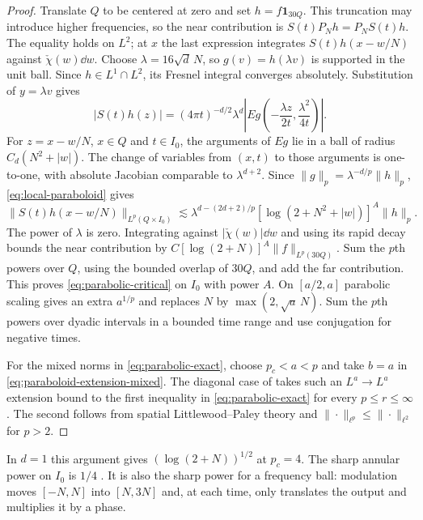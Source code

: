\begin{proof}
Translate $Q$ to be centered at zero and set $h=f\mathbf1_{30Q}$.
This truncation may introduce higher frequencies, so the near contribution
is $S(t)P_Nh=P_NS(t)h$. The equality holds on $L^2$; at $x$ the last
expression integrates $S(t)h(x-w/N)$ against $\check\chi(w)\dd w$.
Choose $\lambda=16\sqrt d\,N$, so $g(v)=h(\lambda v)$ is supported in
the unit ball. Since $h\in L^1\cap L^2$, its Fresnel integral converges
absolutely. Substitution of $y=\lambda v$ gives
\[
 |S(t)h(z)|=(4\pi t)^{-d/2}\lambda^d
   \left|Eg\left(-\frac{\lambda z}{2t},\frac{\lambda^2}{4t}\right)\right|.
\]
For $z=x-w/N$, $x\in Q$ and $t\in I_0$, the arguments of $Eg$ lie in a
ball of radius $C_d(N^2+|w|)$. The change of variables from $(x,t)$
to those arguments is one-to-one, with absolute Jacobian comparable
to $\lambda^{d+2}$. Since $\|g\|_p=\lambda^{-d/p}\|h\|_p$,
\eqref{eq:local-paraboloid} gives
\[
 \|S(t)h(x-w/N)\|_{L^p(Q\times I_0)}
 \lesssim \lambda^{d-(2d+2)/p}
       [\log(2+N^2+|w|)]^A\|h\|_p .
\]
The power of $\lambda$ is zero. Integrating against $|\check\chi(w)|\dd w$
and using its rapid decay bounds the near contribution by
$C[\log(2+N)]^A\|f\|_{L^p(30Q)}$. Sum the $p$th powers over $Q$, using
the bounded overlap of $30Q$, and add the far contribution.
This proves \eqref{eq:parabolic-critical} on $I_0$
with power $A$.
On $[a/2,a]$ parabolic scaling gives an extra $a^{1/p}$ and replaces
$N$ by $\max(2,\sqrt a\,N)$. Sum the $p$th powers over dyadic intervals
in a bounded time range and use conjugation for negative times.

For the mixed norms in \eqref{eq:parabolic-exact}, choose $p_c<a<p$ and
take $b=a$ in \eqref{eq:paraboloid-extension-mixed}. The diagonal case of
\cite[Corollary~1.2]{LRS2013Schrodinger} takes such an $L^a\to L^a$
extension bound to the first inequality in \eqref{eq:parabolic-exact}
for every $p\le r\le\infty$. The second follows from spatial
Littlewood--Paley theory and $\|\cdot\|_{\ell^p}\le\|\cdot\|_{\ell^2}$
for $p>2$.
\end{proof}

In $d=1$ this argument gives $(\log(2+N))^{1/2}$ at $p_c=4$.
The sharp annular power on $I_0$ is $1/4$
\cite[Theorem~1.4 and \S4.1]{LRS2013Schrodinger}. It is also the sharp
power for a frequency ball: modulation moves $[-N,N]$ into $[N,3N]$
and, at each time, only translates the output and multiplies it by a phase.
